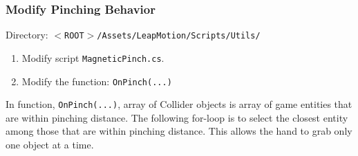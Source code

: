 \documentclass[a4paper]{refart}
\begin{document}
\subsubsection{Modify Pinching Behavior}

Directory: \texttt{$<$ROOT$>$/Assets/LeapMotion/Scripts/Utils/}

\begin{enumerate}
	\item Modify script \texttt{MagneticPinch.cs}.
	\item Modify the function: \texttt{OnPinch(...)}
\end{enumerate}

In function, \texttt{OnPinch(...)}, array of Collider objects is array of game entities that are within pinching distance. The following for-loop is to select the closest entity among those that are within pinching distance. This allows the hand to grab only one object at a time.
\end{document}

